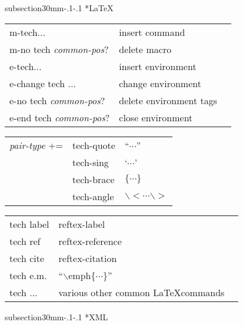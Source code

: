 \documentclass[twocolumn,10pt]{article}
\makeatletter
\renewcommand{\subsubsection}{\@startsection
  {subsection}{3}{0mm}{-.1\baselineskip}{-.1\baselineskip}%
  {\normalfont\bfseries}}
\newcommand{\command}[1]{\textsf{\textup{#1}}}
\newcommand{\cmd}{\sffamily\upshape}
\newcommand{\cat}[1]{\textrm{\textit{#1}}}
\newenvironment{mycenter}
{\begin{trivlist}\item \begin{footnotesize}}
{\end{footnotesize}\end{trivlist}}
\makeatother
\begin{document}
  \subsubsection*{\LaTeX{}}
  \begin{mycenter}
    \begin{tabular}[t]{lll}
      \command{m-tech}... & insert command\\
      \command{m-no tech} \cat{common-pos}? & delete macro\\
      \command{e-tech}...& insert environment\\
      \command{e-change tech} ... & change environment\\
      \command{e-no tech} \cat{common-pos}? & delete environment
      tags\\
      \command{e-end tech} \cat{common-pos}? & close environment\\
    \end{tabular}
  \end{mycenter}

  \begin{mycenter}
    \begin{tabular}[t]{lll}
      \cat{pair-type} += & \cmd tech-quote   & ``$\cdots$''\\
      & \cmd tech-sing & `$\cdots$' \\
      & \cmd tech-brace & $\{\cdots\}$\\
      & \cmd tech-angle & $\backslash$$<$$\cdots$$\backslash>$ \\
    \end{tabular}
  \end{mycenter}

  \begin{mycenter}
    \begin{tabular}[t]{lll}
      \command{tech label} & reftex-label\\
      \command{tech ref} & reftex-reference\\
      \command{tech cite} & reftex-citation\\
      \command{tech e.m.} & ``$\backslash{}$emph$\{\cdots\}$''\\
      \command{tech ...} & various other common \LaTeX commands\\
    \end{tabular}
  \end{mycenter}

  \subsubsection*{XML}
\end{document}

